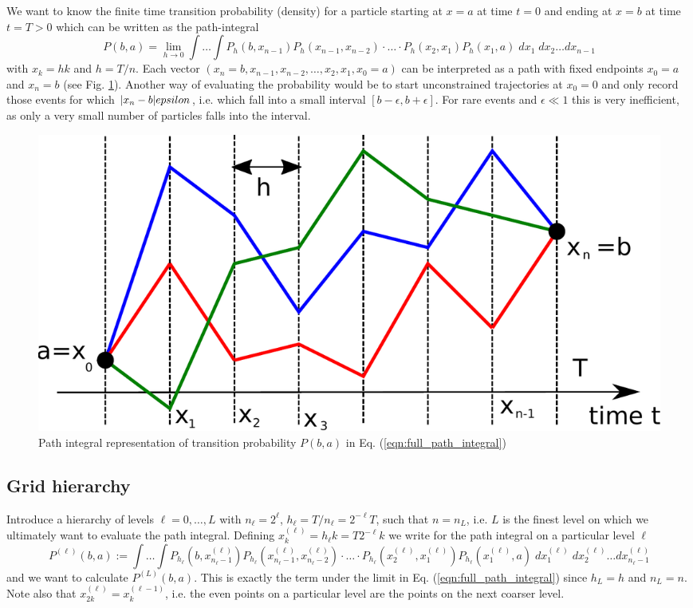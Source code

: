 \documentclass{article}
\begin{document}
We want to know the finite time transition probability (density) for a particle starting at $x=a$ at time $t=0$ and ending at $x=b$ at time $t=T>0$ which can be written as the path-integral
\begin{equation}
P(b,a) = \lim_{h\rightarrow 0}
\int\dots\int
P_h(b,x_{n-1})P_h(x_{n-1},x_{n-2})\cdot\dots\cdot
P_h(x_2,x_1)P_h(x_1,a)\;dx_1\;dx_2\dots dx_{n-1}
\label{eqn:full_path_integral}
\end{equation}
with $x_k=hk$ and $h=T/n$. Each vector $(x_n=b,x_{n-1},x_{n-2},\dots,x_2,x_1,x_0=a)$ can be interpreted as a path with fixed endpoints $x_0=a$ and $x_n=b$ (see Fig. \ref{fig:path_integral}). Another way of evaluating the probability would be to start unconstrained trajectories at $x_0=0$ and only record those events for which $|x_n-b|\\epsilon$, i.e. which fall into a small interval $[b-\epsilon,b+\epsilon]$. For rare events and $\epsilon\ll 1$ this is very inefficient, as only a very small number of particles falls into the interval.
\begin{figure}
\begin{center}
\includegraphics[width=0.5\linewidth]{path_integral.pdf}
\caption{Path integral representation of transition probability $P(b,a)$ in Eq. (\ref{eqn:full_path_integral})}
\label{fig:path_integral}
\end{center}
\end{figure}
\subsection{Grid hierarchy}
Introduce a hierarchy of levels $\ell=0,\dots,L$ with $n_\ell=2^\ell$, $h_\ell=T/n_\ell = 2^{-\ell}T$, such that $n=n_L$, i.e. $L$ is the finest level on which we ultimately want to evaluate the path integral. Defining $x^{(\ell)}_k=h_\ell k=T2^{-\ell}k$ we write for the path integral on a particular level $\ell$
\begin{equation}
P^{(\ell)}(b,a) := 
\int\dots\int
P_{h_\ell}(b,x^{(\ell)}_{n_\ell-1})P_{h_\ell}(x^{(\ell)}_{n_\ell-1},x^{(\ell)}_{n_\ell-2})\cdot\dots\cdot
P_{h_\ell}(x^{(\ell)}_2,x^{(\ell)}_1)P_{h_\ell}(x^{(\ell)}_1,a)\;dx^{(\ell)}_1\;dx^{(\ell)}_2\dots dx^{(\ell)}_{n_\ell-1}\label{eqn:level_integral}
\end{equation}
and we want to calculate $P^{(L)}(b,a)$. This is exactly the term under the limit in Eq. (\ref{eqn:full_path_integral}) since $h_L=h$ and $n_L=n$. Note also that $x^{(\ell)}_{2k}=x^{(\ell-1)}_k$, i.e. the even points on a particular level are the points on the next coarser level.
\end{document}
